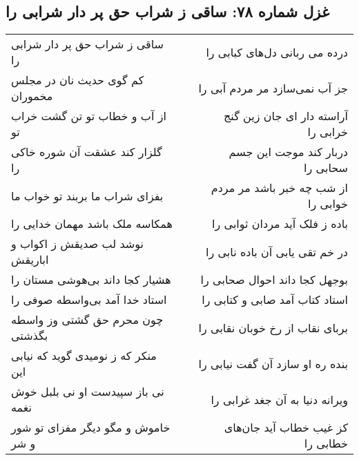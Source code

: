 \begin{center}
\section*{غزل شماره ۷۸: ساقی ز شراب حق پر دار شرابی را}
\label{sec:0078}
\begin{longtable}{l p{0.5cm} r}
ساقی ز شراب حق پر دار شرابی را
&&
درده می ربانی دل‌های کبابی را
\\
کم گوی حدیث نان در مجلس مخموران
&&
جز آب نمی‌سازد مر مردم آبی را
\\
از آب و خطاب تو تن گشت خراب تو
&&
آراسته دار ای جان زین گنج خرابی را
\\
گلزار کند عشقت آن شوره خاکی را
&&
دربار کند موجت این جسم سحابی را
\\
بفزای شراب ما بربند تو خواب ما
&&
از شب چه خبر باشد مر مردم خوابی را
\\
همکاسه ملک باشد مهمان خدایی را
&&
باده ز فلک آید مردان ثوابی را
\\
نوشد لب صدیقش ز اکواب و اباریقش
&&
در خم تقی یابی آن باده نابی را
\\
هشیار کجا داند بی‌هوشی مستان را
&&
بوجهل کجا داند احوال صحابی را
\\
استاد خدا آمد بی‌واسطه صوفی را
&&
استاد کتاب آمد صابی و کتابی را
\\
چون محرم حق گشتی وز واسطه بگذشتی
&&
بربای نقاب از رخ خوبان نقابی را
\\
منکر که ز نومیدی گوید که نیابی این
&&
بنده ره او سازد آن گفت نیابی را
\\
نی باز سپیدست او نی بلبل خوش نغمه
&&
ویرانه دنیا به آن جغد غرابی را
\\
خاموش و مگو دیگر مفزای تو شور و شر
&&
کز غیب خطاب آید جان‌های خطابی را
\\
\end{longtable}
\end{center}
